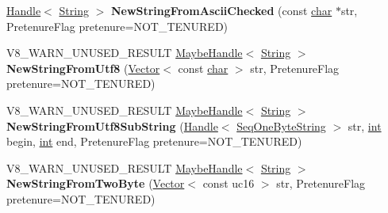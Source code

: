 \begin{DoxyCompactItemize}
\item 
\mbox{\label{classv8_1_1internal_1_1Factory_a1671a135506755e182e579e1260f7068}} 
\mbox{\hyperlink{classv8_1_1internal_1_1Handle}{Handle}}$<$ \mbox{\hyperlink{classv8_1_1internal_1_1String}{String}} $>$ {\bfseries New\+String\+From\+Ascii\+Checked} (const \mbox{\hyperlink{classchar}{char}} $\ast$str, Pretenure\+Flag pretenure=N\+O\+T\+\_\+\+T\+E\+N\+U\+R\+ED)
\item 
\mbox{\label{classv8_1_1internal_1_1Factory_ad67ceaccf02566a88f8e29c55b73625e}} 
V8\+\_\+\+W\+A\+R\+N\+\_\+\+U\+N\+U\+S\+E\+D\+\_\+\+R\+E\+S\+U\+LT \mbox{\hyperlink{classv8_1_1internal_1_1MaybeHandle}{Maybe\+Handle}}$<$ \mbox{\hyperlink{classv8_1_1internal_1_1String}{String}} $>$ {\bfseries New\+String\+From\+Utf8} (\mbox{\hyperlink{classv8_1_1internal_1_1Vector}{Vector}}$<$ const \mbox{\hyperlink{classchar}{char}} $>$ str, Pretenure\+Flag pretenure=N\+O\+T\+\_\+\+T\+E\+N\+U\+R\+ED)
\item 
\mbox{\label{classv8_1_1internal_1_1Factory_ae153abdd9a98e990b061c12571f8be93}} 
V8\+\_\+\+W\+A\+R\+N\+\_\+\+U\+N\+U\+S\+E\+D\+\_\+\+R\+E\+S\+U\+LT \mbox{\hyperlink{classv8_1_1internal_1_1MaybeHandle}{Maybe\+Handle}}$<$ \mbox{\hyperlink{classv8_1_1internal_1_1String}{String}} $>$ {\bfseries New\+String\+From\+Utf8\+Sub\+String} (\mbox{\hyperlink{classv8_1_1internal_1_1Handle}{Handle}}$<$ \mbox{\hyperlink{classv8_1_1internal_1_1SeqOneByteString}{Seq\+One\+Byte\+String}} $>$ str, \mbox{\hyperlink{classint}{int}} begin, \mbox{\hyperlink{classint}{int}} end, Pretenure\+Flag pretenure=N\+O\+T\+\_\+\+T\+E\+N\+U\+R\+ED)
\item 
\mbox{\label{classv8_1_1internal_1_1Factory_a09d396b0be074c77c608cdc624d45f0d}} 
V8\+\_\+\+W\+A\+R\+N\+\_\+\+U\+N\+U\+S\+E\+D\+\_\+\+R\+E\+S\+U\+LT \mbox{\hyperlink{classv8_1_1internal_1_1MaybeHandle}{Maybe\+Handle}}$<$ \mbox{\hyperlink{classv8_1_1internal_1_1String}{String}} $>$ {\bfseries New\+String\+From\+Two\+Byte} (\mbox{\hyperlink{classv8_1_1internal_1_1Vector}{Vector}}$<$ const uc16 $>$ str, Pretenure\+Flag pretenure=N\+O\+T\+\_\+\+T\+E\+N\+U\+R\+ED)
\item 
\mbox{\label{classv8_1_1internal_1_1Factory_aea7d33cd7a75438a2101e5a392f187f4}} 

\end{DoxyCompactItemize}
